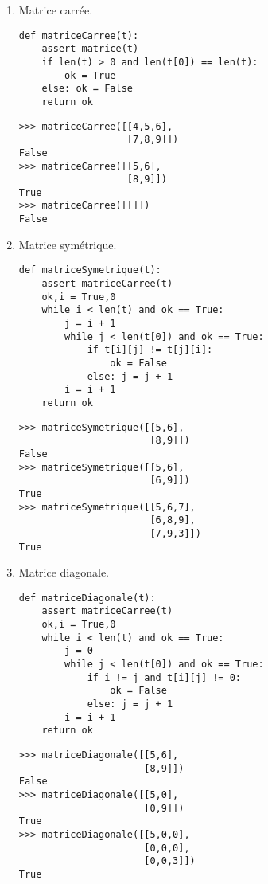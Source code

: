 \begin{description}
\begin{enumerate}
\newpage
\item Matrice carrée.

\begin{py}{6cm}
\begin{verbatim}
def matriceCarree(t):
    assert matrice(t)
    if len(t) > 0 and len(t[0]) == len(t):
        ok = True
    else: ok = False
    return ok
\end{verbatim}
\end{py}
\hfill
\begin{py}{6cm}
\begin{verbatim}
>>> matriceCarree([[4,5,6],
                   [7,8,9]])
False
>>> matriceCarree([[5,6],
                   [8,9]])
True
>>> matriceCarree([[]])
False
\end{verbatim}
\end{py}
\vspace*{2mm}

\item Matrice symétrique.

\begin{py}{6cm}
\begin{verbatim}
def matriceSymetrique(t):
    assert matriceCarree(t)
    ok,i = True,0
    while i < len(t) and ok == True:
        j = i + 1
        while j < len(t[0]) and ok == True:
            if t[i][j] != t[j][i]: 
                ok = False
            else: j = j + 1
        i = i + 1
    return ok
\end{verbatim}
\end{py}
\hfill
\begin{py}{6cm}
\begin{verbatim}
>>> matriceSymetrique([[5,6],
                       [8,9]])
False
>>> matriceSymetrique([[5,6],
                       [6,9]])
True
>>> matriceSymetrique([[5,6,7],
                       [6,8,9],
                       [7,9,3]])
True
\end{verbatim}
\end{py}
\vspace*{2mm}

\item Matrice diagonale.

\begin{py}{6cm}
\begin{verbatim}
def matriceDiagonale(t):
    assert matriceCarree(t)
    ok,i = True,0
    while i < len(t) and ok == True:
        j = 0
        while j < len(t[0]) and ok == True:
            if i != j and t[i][j] != 0:
                ok = False
            else: j = j + 1
        i = i + 1
    return ok
\end{verbatim}
\end{py}
\hfill
\begin{py}{6cm}
\begin{verbatim}
>>> matriceDiagonale([[5,6],
                      [8,9]])
False
>>> matriceDiagonale([[5,0],
                      [0,9]])
True
>>> matriceDiagonale([[5,0,0],
                      [0,0,0],
                      [0,0,3]])
True
\end{verbatim}
\end{py}
\vspace*{2mm}


\end{enumerate}
\end{description}
